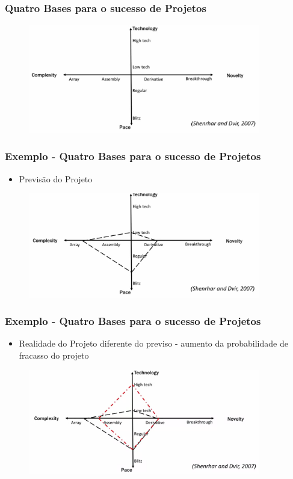   \begin{frame}
   \frametitle{Quatro Bases para o sucesso de Projetos}
    \begin{figure}
  \centering
  \includegraphics[width = 0.9\textwidth]{figs/fig_proj5.png}
 \end{figure}
  \end{frame}

    \begin{frame}
   \frametitle{Exemplo - Quatro Bases para o sucesso de Projetos}
   \begin{itemize}
    \item Previsão do Projeto
   \end{itemize}
    \begin{figure}
  \centering
  \includegraphics[width = 0.9\textwidth]{figs/fig_proj51.png}
 \end{figure}
  \end{frame}

      \begin{frame}
   \frametitle{Exemplo - Quatro Bases para o sucesso de Projetos}
   \begin{itemize}
    \item Realidade do Projeto diferente do previso - aumento da probabilidade de fracasso do projeto
   \end{itemize}
    \begin{figure}
  \centering
  \includegraphics[width = 0.9\textwidth]{figs/fig_proj52.png}
 \end{figure}
  \end{frame}

